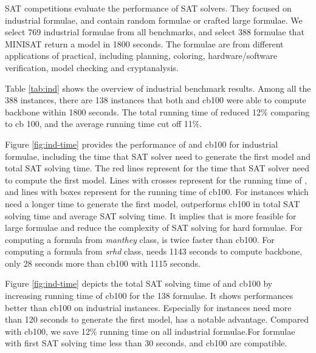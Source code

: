 SAT competitions evaluate the performance of SAT solvers. They focused on industrial formulae, and contain random formulae or crafted large formulae. We select 769 industrial formulae from all benchmarks, and select 388 formulae that MINISAT return a model in 1800 seconds. The formulae are from different applications of practical, including planning, coloring, hardware/software verification, model checking and cryptanalysis.

Table \ref{tab:ind} shows the overview of industrial benchmark results. Among all the 388 instances, there are 138 instances that both \tool and cb100 were able to compute backbone within 1800 seconds. The total running time of \tool reduced 12\% comparing to cb 100, and the average running time cut off 11\%.

Figure \ref{fig:ind-time} provides the performance of \tool and cb100 for industrial formulae, including the time that SAT solver need to generate the first model and total SAT solving time. The red lines represent for the time that SAT solver need to compute the first model. Lines with crosses represent for the running time of \tool, and lines with boxes represent for the running time of cb100. For instances which need a longer time to generate the first model, \tool outperforms cb100 in total SAT solving time and average SAT solving time. It implies that \tool is more feasible for large formulae and reduce the complexity of SAT solving for hard formulae.
For computing a formula from \emph{manthey} class, \tool is twice faster than cb100.
For computing a formula from \emph{srhd} class, \tool needs 1143 seconds to compute backbone, only 28 seconds more than cb100 with 1115 seconds.


Figure \ref{fig:ind-time} depicts the total SAT solving time of \tool and cb100 by increasing running time of cb100 for the 138 formulae. It shows  \tool performances better than cb100 on industrial instances. Especially for instances need more than 120 seconds to generate the first model, \tool has a notable advantage. Compared with cb100, we save 12\% running time on all industrial formulae.For formulae with first SAT solving time less than 30 seconds, \tool and cb100 are compatible.

